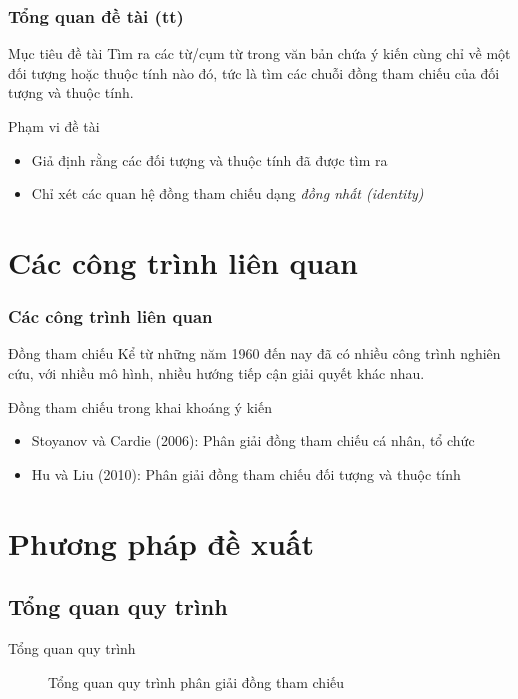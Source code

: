 \documentclass[9pt,xcolor=table,hyperref=unicode]{beamer}
\begin{document}
	\begin{frame}
		\frametitle{Tổng quan đề tài (tt)}
		\begin{block}{Mục tiêu đề tài}
			Tìm ra các từ/cụm từ trong văn bản chứa ý kiến cùng chỉ về một đối tượng hoặc thuộc tính nào đó, tức là tìm các chuỗi đồng tham chiếu của đối tượng và thuộc tính.
		\end{block}		
		\begin{block}{Phạm vi đề tài}
			\begin{itemize}
				\item{Giả định rằng các đối tượng và thuộc tính đã được tìm ra}
				\item{Chỉ xét các quan hệ đồng tham chiếu dạng \textit{đồng nhất (identity)}}
			\end{itemize}
		\end{block}
	\end{frame}


	\section{Các công trình liên quan}
	\begin{frame}
		\frametitle{Các công trình liên quan}
		\begin{block}{Đồng tham chiếu}
			Kể từ những năm 1960 đến nay đã có nhiều công trình nghiên cứu, với nhiều mô hình, nhiều hướng tiếp cận giải quyết khác nhau.
		\end{block}
		\begin{block}{Đồng tham chiếu trong khai khoáng ý kiến}
			\begin{itemize}
				\item{Stoyanov và Cardie (2006): Phân giải đồng tham chiếu cá nhân, tổ chức}
				\item{Hu và Liu (2010): Phân giải đồng tham chiếu đối tượng và thuộc tính}
			\end{itemize}
		\end{block}		
	\end{frame}

	\section{Phương pháp đề xuất}
	\subsection{Tổng quan quy trình}
	\begin{frame}{Tổng quan quy trình}		
		\begin{figure}[H]
			\LARGE 
			\centering				
			\resizebox{100mm}{!}{}
			\caption{Tổng quan quy trình phân giải đồng tham chiếu}	
			\label{fig:generalmodel}						
		\end{figure}
	\end{frame}	
\end{document}

